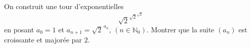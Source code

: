On construit une tour d'exponentielles
\[ \sqrt{2}^{\sqrt{2}^{\sqrt{2}^{\cdot^{\cdot^{\cdot}}}}} \]
en posant $a_0 = 1$ et $a_{n+1} = \sqrt{2}^{\,a_n}$, $(n \in \mathbb{N}_0)$. Montrer que la suite $(a_n)$ est croissante et majorée par $2$.
